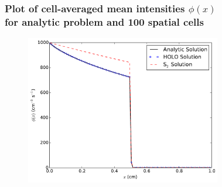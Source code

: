 \documentclass[xcolor=dvipsnames,hyperref={pdfpagelabels=false},unknownkeysallowed]{beamer}
\begin{document}
\begin{frame}
\begin{columns}
\begin{column}{0.5\textwidth}
    \end{column}
\end{columns}
\end{frame}

\begin{frame}
    \frametitle{Plot of cell-averaged mean intensities $\phi(x)$ \\ for analytic problem and 100 spatial cells}
    \begin{figure}
        \vspace{-0.1in} \includegraphics[width=0.76099\textwidth]{neut_analytic_phi.pdf}
    \centering
    \end{figure}
\end{frame}
\end{document}
